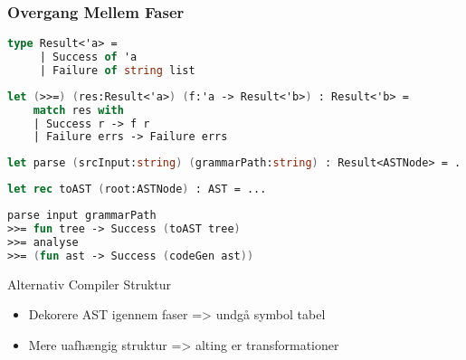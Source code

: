 \begin{frame}[fragile]
  \frametitle{Overgang Mellem Faser}
  \begin{lstlisting}[language=fsharp]
type Result<'a> =
     | Success of 'a
     | Failure of string list
  \end{lstlisting}

  \begin{lstlisting}[language=fsharp]
let (>>=) (res:Result<'a>) (f:'a -> Result<'b>) : Result<'b> =
    match res with
    | Success r -> f r
    | Failure errs -> Failure errs
  \end{lstlisting}

  \begin{lstlisting}[language=fsharp]
let parse (srcInput:string) (grammarPath:string) : Result<ASTNode> = ...
  \end{lstlisting}

  \begin{lstlisting}[language=fsharp]
let rec toAST (root:ASTNode) : AST = ...
  \end{lstlisting}
  
  \begin{lstlisting}[language=fsharp]
parse input grammarPath 
>>= fun tree -> Success (toAST tree)
>>= analyse
>>= (fun ast -> Success (codeGen ast))
  \end{lstlisting}

\end{frame}

\begin{frame}{Alternativ Compiler Struktur}
  \begin{itemize}
    \item Dekorere AST igennem faser => undgå symbol tabel
    \item Mere uafhængig struktur => alting er transformationer
  \end{itemize}

\end{frame}